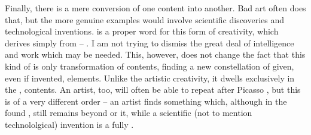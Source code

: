 \pa \imm Finally, there is a mere conversion of one 
content into another.  Bad art often does that, but the more genuine
examples would involve scientific discoveries and technological
inventions.   is a proper word for this form of creativity,
which derives simply from  -- .  I am not
trying to dismiss the great deal of intelligence and work which may be
needed.  This, however, does not change the fact that 
this kind of  is only transformation of 
contents, finding a new constellation of given, even if invented,
elements.  Unlike the artistic creativity, it dwells exclusively in
the ,  contents.  An artist, too, will
often be able to repeat after Picasso ,
but this  is of a very different order -- an artist finds
something which, although  in the found ,
still remains beyond or  it, while a scientific (not to
mention technololgical) invention is a fully .

%     

%
 

%

